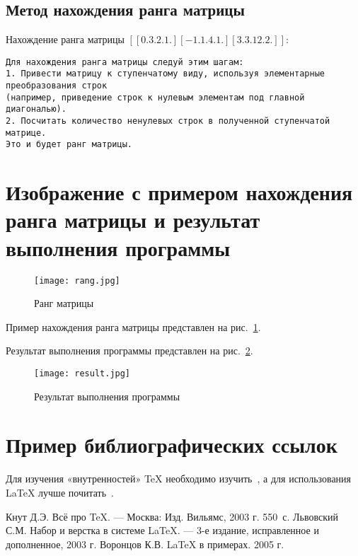 \documentclass{article}
\begin{document}
\subsection{Метод нахождения ранга матрицы}
\label{sec:mathexample}

Нахождение ранга матрицы
\([[ 0.  3.  2.  1.]
 [-1.  1.  4.  1.]
 [ 3.  3. 12.  2.]]\):
\begin{verbatim}
Для нахождения ранга матрицы следуй этим шагам:
1. Привести матрицу к ступенчатому виду, используя элементарные преобразования строк
(например, приведение строк к нулевым элементам под главной диагональю).
2. Посчитать количество ненулевых строк в полученной ступенчатой матрице.
Это и будет ранг матрицы.
\end{verbatim}

\section{Изображение с примером нахождения ранга матрицы и результат выполнения программы}
\label{sec:picexample}
\begin{figure}[h]
	\centering
	\texttt{[image: rang.jpg]}
	\caption{Ранг матрицы}\label{fig:par}
\end{figure}
Пример нахождения ранга матрицы представлен на рис.~\ref{fig:par}.

Результат выполнения программы представлен на рис.~\ref{fig:par2}.
\label{sec:picexample}
\begin{figure}[H]
	\centering
	\texttt{[image: result.jpg]}
	\caption{Результат выполнения программы}\label{fig:par2}
\end{figure}



\section{Пример библиографических ссылок}

Для изучения «внутренностей» \TeX{} необходимо 
изучить~\cite{Knuth-2003}, а для использования \LaTeX{} лучше
почитать~\cite{Lvovsky-2003, Voroncov-2005}.

\begin{thebibliography}{9}
Кнут Д.Э. Всё про \TeX. \newblock --- Москва: Изд. Вильямс, 2003 г. 550~с.
Львовский С.М. Набор и верстка в системе \LaTeX{}. \newblock --- 3-е издание, исправленное и дополненное, 2003 г.
Воронцов К.В. \LaTeX{} в примерах. 2005 г.
\end{thebibliography}
\end{document}
